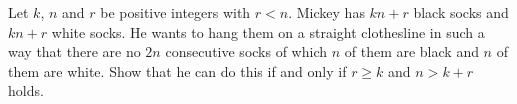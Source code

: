 Let $k$, $n$ and $r$ be positive integers with $r < n$.
Mickey has $kn + r$ black socks and $kn + r$ white socks.
He wants to hang them on a straight clothesline in such a way that
there are no $2n$ consecutive socks of which $n$ of them are black and $n$ of them are white.
Show that he can do this if and only if $r \geq k$ and $n > k + r$ holds.
